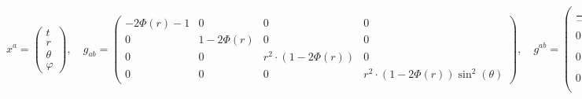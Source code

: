 \documentclass[11pt]{article}
\begin{document}
\begin{landscape}
    $$x^{a}=\begin{pmatrix}t\\r\\\theta\\\varphi\end{pmatrix},\quad g_{ab}=\begin{pmatrix} - 2 \Phi{\left(r \right)} - 1 & 0 & 0 & 0\\ 0 & 1 - 2 \Phi{\left(r \right)} & 0 & 0\\ 0 & 0 & r^{2} \cdot \left(1 - 2 \Phi{\left(r \right)}\right) & 0\\ 0 & 0 & 0 & r^{2} \cdot \left(1 - 2 \Phi{\left(r \right)}\right) \sin^{2}{\left(\theta \right)} \end{pmatrix},\quad g^{ab}=\begin{pmatrix} \frac{1}{- 2 \Phi{\left(r \right)} - 1} & 0 & 0 & 0\\ 0 & \frac{1}{1 - 2 \Phi{\left(r \right)}} & 0 & 0\\ 0 & 0 & - \frac{1}{2 r^{2} \Phi{\left(r \right)} - r^{2}} & 0\\ 0 & 0 & 0 & - \frac{1}{2 r^{2} \Phi{\left(r \right)} \sin^{2}{\left(\theta \right)} - r^{2} \sin^{2}{\left(\theta \right)}} \end{pmatrix},$$

\end{landscape}
\end{document}
